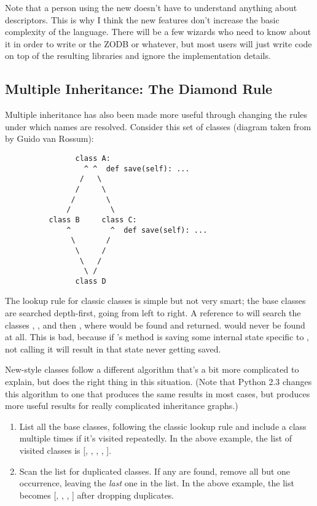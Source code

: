\documentclass{howto}
\begin{document}
Note that a person using the new  doesn't
have to understand anything about descriptors.  This is why I think
the new features don't increase the basic complexity of the language.
There will be a few wizards who need to know about it in order to
write  or the ZODB or whatever, but most
users will just write code on top of the resulting libraries and
ignore the implementation details.


\subsection{Multiple Inheritance: The Diamond Rule}

Multiple inheritance has also been made more useful through changing
the rules under which names are resolved.  Consider this set of classes
(diagram taken from  by Guido van Rossum):

\begin{verbatim}
                class A:
                  ^ ^  def save(self): ...
                 /   \
                /     \
               /       \
              /         \
          class B     class C:
              ^         ^  def save(self): ...
               \       /
                \     /
                 \   /
                  \ /
                class D
\end{verbatim}

The lookup rule for classic classes is simple but not very smart; the
base classes are searched depth-first, going from left to right.  A
reference to  will search the classes ,
, and then , where  would be found
and returned.  \method{C.save()} would never be found at all.  This is
bad, because if \class{C}'s \method{save()} method is saving some
internal state specific to \class{C}, not calling it will result in
that state never getting saved.

New-style classes follow a different algorithm that's a bit more
complicated to explain, but does the right thing in this situation.
(Note that Python 2.3 changes this algorithm to one that produces the
same results in most cases, but produces more useful results for
really complicated inheritance graphs.)

\begin{enumerate}

\item List all the base classes, following the classic lookup rule and
include a class multiple times if it's visited repeatedly.  In the
above example, the list of visited classes is [, ,
, , ].

\item Scan the list for duplicated classes.  If any are found, remove
all but one occurrence, leaving the \emph{last} one in the list.  In
the above example, the list becomes [, , ,
] after dropping duplicates.

\end{enumerate}
\end{document}
